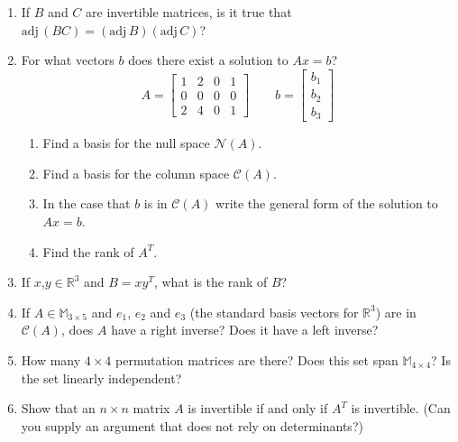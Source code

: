 \documentclass[11pt]{article}
\newcommand{\adj}{\textrm{adj}\,}
\begin{document}
\begin{enumerate}
\item{If $B$ and $C$ are invertible matrices, is it true that $\adj{(BC)} = (\adj{B})(\adj{C})$?}

\item{For what vectors $b$ does there exist a solution to $Ax=b$?
\begin{displaymath}
A = \left[ \begin{array}{rrrr} 1 &  2 &  0 & 1 \\ 0 & 0 & 0 & 0\\ 2 & 4 & 0 & 1 \end{array} \right] \quad \quad b = \left [ \begin{array}{r} b_1 \\ b_2 \\ b_3 \end{array} \right ]
\end{displaymath}
\begin{enumerate}
\item{Find a basis for the null space $\mathcal{N}(A)$.}
\item{Find a basis for the column space $\mathcal{C}(A)$.}
\item{In the case that $b$ is in $\mathcal{C}(A)$ write the general form of the solution to $Ax=b$.}
\item{Find the rank of $A^T$}.
\end{enumerate}
}

\item{If $x$,$y \in \mathbb{R}^3$ and $B = xy^T$, what is the rank of $B$? }
\item{If $A \in \mathbb{M}_{3\times 5}$ and $e_1$, $e_2$ and $e_3$ (the standard basis vectors for $\mathbb{R}^3$) are in $\mathcal{C}(A)$, does $A$ have a right inverse?  Does it have a left inverse?}
\item{How many $4\times 4$ permutation matrices are there?  Does this set span $\mathbb{M}_{4\times 4}$?  Is the set linearly independent?}
\item{Show that an $n\times n$ matrix $A$ is invertible if and only if $A^T$ is invertible.  (Can you supply an argument that does not rely on determinants?)}


\end{enumerate}

\vspace{0.1in}
\end{document}
